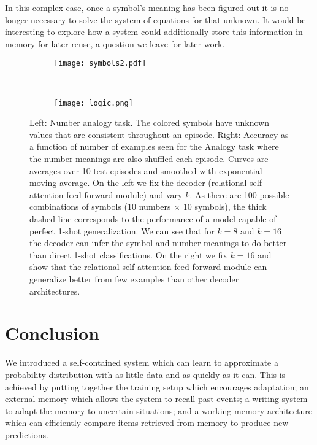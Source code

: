 \documentclass{article} \usepackage{iclr2019_conference,times}
\begin{document}
In this complex case, once a symbol's meaning has been figured out it is no longer necessary to solve the system of equations for that unknown. It would be interesting to explore how a system could additionally store this information in memory for later reuse, a question we leave for later work.

\begin{figure}[ht]
    \centering
    \begin{subfigure}[c]{0.3\textwidth}
        \texttt{[image: symbols2.pdf]}
        \label{fig:symbols}
    \end{subfigure}
    ~ \begin{subfigure}[c]{0.68\textwidth}
        \texttt{[image: logic.png]}
        \label{fig:logic}
    \end{subfigure}
    \caption{Left: Number analogy task. The colored symbols have unknown values that are consistent throughout an episode. Right: Accuracy as a function of number of examples seen for the Analogy task where the number meanings are also shuffled each episode. Curves are averages over 10 test episodes and smoothed with exponential moving average. On the left we fix the decoder (relational self-attention feed-forward module) and vary $k$. As there are 100 possible combinations of symbols (10 numbers $\times$ 10 symbols), the thick dashed line corresponds to the performance of a model capable of perfect 1-shot generalization. We can see that for $k=8$ and $k=16$ the decoder can infer the symbol and number meanings to do better than direct 1-shot classifications. On the right we fix $k=16$ and show that the relational self-attention feed-forward module can generalize better from few examples than other decoder architectures.}
    \label{fig:analogy}
\end{figure}




\section{Conclusion}

We introduced a self-contained system which can learn to approximate a probability distribution with as little data and as quickly as it can. This is achieved by putting together the training setup which encourages adaptation; an external memory which allows the system to recall past events; a writing system to adapt the memory to uncertain situations; and a working memory architecture which can efficiently compare items retrieved from memory to produce new predictions.
\end{document}
